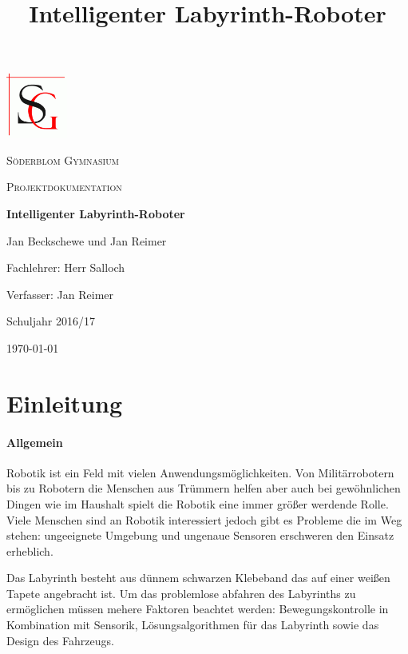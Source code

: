 \documentclass[12pt]{article}
\title{Intelligenter Labyrinth-Roboter}
\begin{document}
\begin{titlepage}
	\centering
	\includegraphics[width=0.15\textwidth]{sg-logo.png}\par\vspace{1cm}
	{\scshape\LARGE Söderblom Gymnasium \par}
	\vspace{1cm}
	{\scshape\Large Projektdokumentation\par}
	\vspace{1.5cm}
	{\huge\bfseries Intelligenter Labyrinth-Roboter\par}
	\vspace{1.5cm}
	{\Large Jan Beckschewe und Jan Reimer \par}
	\vspace{1.5cm}
	Fachlehrer: Herr Salloch \par
    \vspace{0.5cm}
    Verfasser: Jan Reimer \par
    \vspace{1cm}
	Schuljahr 2016/17 \par
    
	\vfill

	{\large \today\par}
\end{titlepage}
\restoregeometry
\tableofcontents
\thispagestyle{empty}
\newpage
\setcounter{page}{3}
\section{Einleitung}
\paragraph{Allgemein} Robotik ist ein Feld mit vielen Anwendungsmöglichkeiten. Von Militärrobotern bis zu Robotern die Menschen aus Trümmern helfen aber auch bei gewöhnlichen Dingen wie im Haushalt spielt die Robotik eine immer größer werdende Rolle. Viele Menschen sind an Robotik interessiert jedoch gibt es Probleme die im Weg stehen: ungeeignete Umgebung und ungenaue Sensoren erschweren den Einsatz erheblich.  

Das Labyrinth besteht aus dünnem schwarzen Klebeband das auf einer weißen Tapete angebracht ist. Um das problemlose abfahren des Labyrinths zu ermöglichen müssen mehere Faktoren beachtet werden: Bewegungskontrolle in Kombination mit Sensorik, Lösungsalgorithmen für das Labyrinth sowie das Design des Fahrzeugs.
\end{document}
